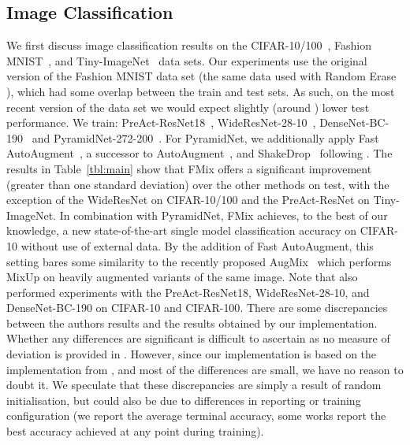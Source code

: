 \documentclass[journal]{IEEEtran}
\newcommand{\fmix}{FMix\xspace}
\newcommand{\mixup}{MixUp\xspace}
\newcommand{\cifar}[1]{CIFAR-{#1}\xspace}
\newcommand{\imagenet}{ImageNet\xspace}
\begin{document}
\subsection{Image Classification}
We first discuss image classification results on the \cifar{10/100}~\citep{krizhevsky2009learning}, Fashion MNIST~\citep{xiao2017fashion}, and Tiny-\imagenet~\citep{tinyimagenet} data sets.
Our experiments use the original version of the Fashion MNIST data set (the same data used with Random Erase \citep{zhong2017random}), which had some overlap between the train and test sets. As such, on the most recent version of the data set we would expect slightly (around ) lower test performance. 
We train: PreAct-ResNet18~\citep{he2016identity}, WideResNet-28-10~\citep{zagoruyko2016wide}, DenseNet-BC-190~\citep{huang2017densely} and PyramidNet-272-200~\citep{pyramidnet}. For PyramidNet, we additionally apply Fast AutoAugment~\citep{lim2019fast}, a successor to AutoAugment~\citep{cubuk2019autoaugment}, and ShakeDrop~\citep{yamada2018shakedrop} following \citet{lim2019fast}.
The results in Table~\ref{tbl:main} show that \fmix offers a significant improvement (greater than one standard deviation) over the other methods on test, with the exception of the WideResNet on \cifar{10/100} and the PreAct-ResNet on Tiny-\imagenet.
In combination with PyramidNet, \fmix achieves, to the best of our knowledge, a new state-of-the-art single model classification accuracy on \cifar{10} without use of external data. By the addition of Fast AutoAugment, this setting bares some similarity to the recently proposed AugMix~\citep{hendrycks2019augmix} which performs \mixup on heavily augmented variants of the same image.
Note that \citet{zhang2017mixup} also performed experiments with the PreAct-ResNet18, WideResNet-28-10, and DenseNet-BC-190 on \cifar{10} and \cifar{100}. There are some discrepancies between the authors results and the results obtained by our implementation. Whether any differences are significant is difficult to ascertain as no measure of deviation is provided in \citet{zhang2017mixup}.
However, since our implementation is based on the implementation from \citet{zhang2017mixup}, and most of the differences are small, we have no reason to doubt it. We speculate that these discrepancies are simply a result of random initialisation, but could also be due to differences in reporting or training configuration (we report the average terminal accuracy, some works report the best accuracy achieved at any point during training).
\end{document}
